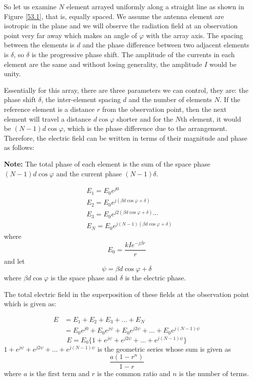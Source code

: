 So let us examine $N$ element arrayed uniformly along a straight line as shown in Figure \ref{53.1}, that is, equally spaced. We assume the antenna element are isotropic in the plane and we will observe the radiation field at an observation point very far away which makes an angle of $\varphi$ with the array axis. The spacing between the elements is $d$ and the phase difference between two adjacent elements is $\delta$, so $\delta$ is the progressive phase shift. The amplitude of the currents in each element are the same and without losing generality, the amplitude $I$ would be unity.

Essentially for this array, there are three parameters we can control, they are: the phase shift $\delta$, the inter-element spacing $d$ and the number of elements $N$. If the reference element is a distance $r$ from the observation point,  then the next element will travel a distance $d\cos\varphi$ shorter and for the $N$th element, it would be $(N-1) d\cos\varphi $, which is the phase difference due to the arrangement. Therefore, the electric field can be written in terms of their magnitude and phase as follows:

\textbf{Note:} The total phase of each element is the sum of the space phase $(N-1) d\cos\varphi$ and the current phase $(N-1) \delta$.

\begin{align*}
&E_1 = E_0 e^{j0}\\
&E_2 = E_0 e^{j(\beta d\cos\varphi + \delta)} \\
&E_3 = E_0 e^{j2(\beta d\cos\varphi + \delta)} \cdots \\
&E_N = E_0 e^{j(N-1)(\beta d\cos\varphi + \delta)}
\end{align*}
where $$E_0 = \frac{kIe^{-j\beta r}}{r}$$ and let $$\psi = \beta d\cos\varphi + \delta$$ where $\beta d\cos\varphi$ is the space phase and $\delta$ is the electric phase.

The total electric field in the superposition of these fields at the observation point which is given as:

\begin{align*}
E &= E_1 + E_2 + E_3 + \dots + E_N \\
&= E_0e^{j0} + E_0e^{j\psi} + E_0e^{j2\psi} + \dots + E_0e^{j(N-1)\psi}
\end{align*}
\begin{equation}
\label{34}
E = E_0 \{1 + e^{j\psi} + e^{j2\psi} + \dots + e^{j(N-1)\psi} \}
\end{equation}
$1 + e^{j\psi} + e^{j2\psi} + \dots + e^{j(N-1)\psi}$ is the geometric series whose sum is given  as $$\frac{a(1-r^n)}{1-r}$$ where $a$ is the first term and $r$ is the common ratio and $n$ is the number of terms.

